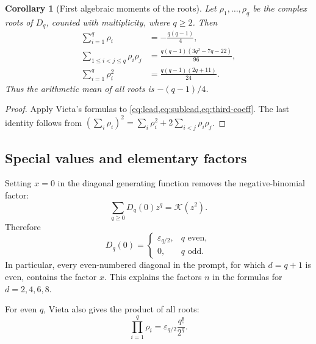 \documentclass[11pt]{article}
\newtheorem{corollary}[theorem]{Corollary}
\theoremstyle{definition}
\theoremstyle{remark}
\newcommand{\eps}{\varepsilon}
\newcommand{\K}{\mathcal K}
\newcommand{\Diag}{D}
\begin{document}
\begin{corollary}[First algebraic moments of the roots]
Let \(\rho_1,\ldots,\rho_q\) be the complex roots of \(\Diag_q\), counted
with multiplicity, where \(q\geq2\).  Then
\begin{align}
 \sum_{i=1}^{q}\rho_i
   &=-\frac{q(q-1)}4,                                      \label{eq:root-sum}\\
 \sum_{1\leq i<j\leq q}\rho_i\rho_j
   &=\frac{q(q-1)(3q^2-7q-22)}{96},                        \label{eq:root-e2}\\
 \sum_{i=1}^{q}\rho_i^2
   &=\frac{q(q-1)(2q+11)}{24}.                             \label{eq:root-square-sum}
\end{align}
Thus the arithmetic mean of all roots is \(-(q-1)/4\).
\end{corollary}

\begin{proof}
Apply Vieta's formulas to \cref{eq:lead,eq:sublead,eq:third-coeff}.  The last
identity follows from
\((\sum_i\rho_i)^2=\sum_i\rho_i^2+2\sum_{i<j}\rho_i\rho_j\).
\end{proof}

\subsection{Special values and elementary factors}

Setting \(x=0\) in the diagonal generating function removes the
negative-binomial factor:
\begin{equation}
 \sum_{q\geq0}\Diag_q(0)z^q=\K(z^2).
\end{equation}
Therefore
\begin{equation}
 \Diag_q(0)=
 \begin{cases}
  \eps_{q/2},&q\text{ even},\\
  0,&q\text{ odd}.
 \end{cases}                                               \label{eq:value-zero}
\end{equation}
In particular, every even-numbered diagonal in the prompt, for which
\(d=q+1\) is even, contains the factor \(x\).  This explains the factors
\(n\) in the formulas for \(d=2,4,6,8\).

For even \(q\), Vieta also gives the product of all roots:
\begin{equation}
 \prod_{i=1}^{q}\rho_i
 =\eps_{q/2}\frac{q!}{2^q}.                                \label{eq:root-product-even}
\end{equation}
\end{document}
